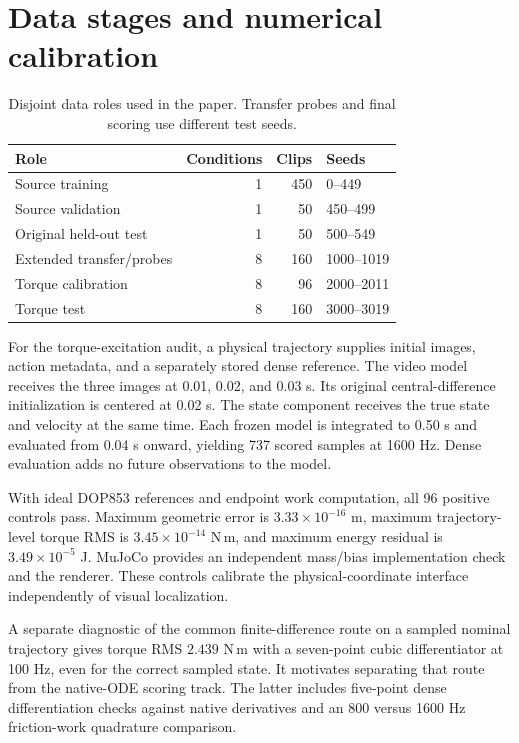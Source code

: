 \section{Data stages and numerical calibration}
\label{app:calibration}
\begin{table}[t]
\caption{Disjoint data roles used in the paper. Transfer probes and final scoring use different test seeds.}
\centering
\small
\begin{tabular}{lrrl}
\toprule
Role & Conditions & Clips & Seeds\\
\midrule
Source training & 1 & 450 & 0--449\\
Source validation & 1 & 50 & 450--499\\
Original held-out test & 1 & 50 & 500--549\\
Extended transfer/probes & 8 & 160 & 1000--1019\\
Torque calibration & 8 & 96 & 2000--2011\\
Torque test & 8 & 160 & 3000--3019\\
\bottomrule
\end{tabular}
\end{table}

For the torque-excitation audit, a physical trajectory supplies initial images, action metadata, and a separately stored dense reference. The video model receives the three images at 0.01, 0.02, and 0.03 s. Its original central-difference initialization is centered at 0.02 s. The state component receives the true state and velocity at the same time. Each frozen model is integrated to 0.50 s and evaluated from 0.04 s onward, yielding 737 scored samples at 1600 Hz. Dense evaluation adds no future observations to the model.

With ideal DOP853 references and endpoint work computation, all 96 positive controls pass. Maximum geometric error is $3.33\times10^{-16}$ m, maximum trajectory-level torque RMS is $3.45\times10^{-14}$ N\,m, and maximum energy residual is $3.49\times10^{-5}$ J. MuJoCo provides an independent mass/bias implementation check and the renderer. These controls calibrate the physical-coordinate interface independently of visual localization.

A separate diagnostic of the common finite-difference route on a sampled nominal trajectory gives torque RMS $2.439$ N\,m with a seven-point cubic differentiator at 100 Hz, even for the correct sampled state. It motivates separating that route from the native-ODE scoring track. The latter includes five-point dense differentiation checks against native derivatives and an 800 versus 1600 Hz friction-work quadrature comparison.

